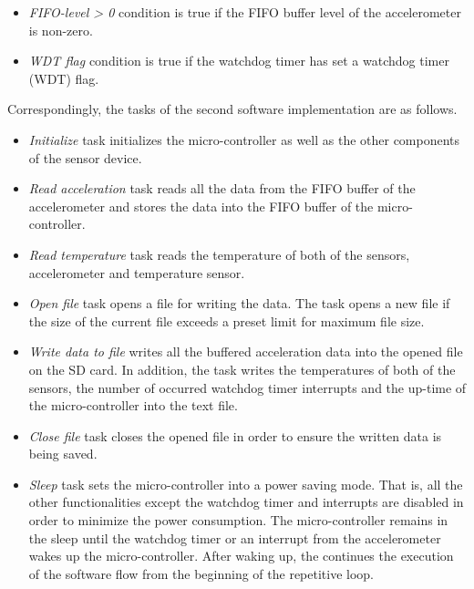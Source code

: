 \documentclass[english,12pt,a4paper,pdftex,elec,utf8]{aaltothesis}
\begin{document}
 
\begin{itemize}
\item \textit{FIFO-level > 0} condition is true if the FIFO buffer level of the accelerometer is non-zero.

\item \textit{WDT flag} condition is true if the watchdog timer has set a watchdog timer (WDT) flag.
\end{itemize}
Correspondingly, the tasks of the second software implementation are as follows.


\begin{itemize}
\item \textit{Initialize} task initializes the micro-controller as well as the other components of the sensor device.

\item \textit{Read acceleration} task reads all the data from the FIFO buffer of the accelerometer and stores the data into the FIFO buffer of the micro-controller.

\item \textit{Read temperature} task reads the temperature of both of the sensors, accelerometer and temperature sensor.

\item \textit{Open file} task opens a file for writing the data. The task opens a new file if the size of the current file exceeds a preset limit for maximum file size.

\item \textit{Write data to file} writes all the buffered acceleration data into the opened file on the SD card. In addition, the task writes the temperatures of both of the sensors, the number of occurred watchdog timer interrupts and the up-time of the micro-controller into the text file.

\item \textit{Close file} task closes the opened file in order to ensure the written data is being saved. 

\item \textit{Sleep} task sets the micro-controller into a power saving mode. That is, all the other functionalities except the watchdog timer and interrupts are disabled in order to minimize the power consumption. The micro-controller remains in the sleep until the watchdog timer or an interrupt from the accelerometer wakes up the micro-controller. After waking up, the continues the execution of the software flow from the beginning of the repetitive loop.

\end{itemize}
\end{document}
